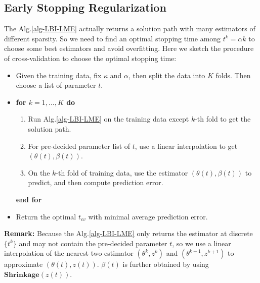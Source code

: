 \documentclass[10pt,journal,cspaper,compsoc]{IEEEtran}
\begin{document}
{\subsection{Early Stopping Regularization} \label{sec:cv}
The Alg.\ref{alg-LBI-LME} actually returns a solution path with many estimators of different sparsity. So we need to find an optimal stopping time among $t^k=\alpha k$ to choose some best estimators and avoid overfitting. Here we sketch the procedure of cross-validation to choose the optimal stopping time:
\begin{itemize}
\item Given the training data, fix $\kappa$ and $\alpha$, then split the data into $K$ folds. Then choose a list of parameter $t$.
\item \textbf{for $k=1,\dots,K$ do}
	\begin{enumerate}
	\item Run Alg.\ref{alg-LBI-LME} on the training data except $k$-th fold to get the solution path.
	\item For pre-decided parameter list of $t$, use a linear interpolation to get $(\theta(t),\beta(t))$.
	\item On the $k$-th fold of training data, use the estimator $(\theta(t),\beta(t))$ to predict, and then compute prediction error.
	\end{enumerate}
	\textbf{end for}
\item  Return the optimal $t_{cv}$ with minimal average prediction error.
\end{itemize}
\textbf{Remark:} Because the Alg.\ref{alg-LBI-LME} only returns the estimator at discrete $\{t^k\}$ and may not contain the pre-decided parameter $t$, so we use a linear interpolation of the nearest two estimator $(\theta^{k},z^{k})$ and $(\theta^{k+1},z^{k+1})$ to approximate $(\theta(t),z(t))$. $\beta(t)$ is further obtained by using $\mathbf{Shrinkage}(z(t))$.




}
\end{document}
